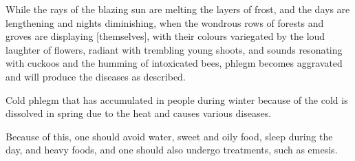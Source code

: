 \begin{translation}
\item[39--41] %
While the rays of the blazing sun %
are melting %
the layers of frost, %
and the days are lengthening and nights diminishing, %
%
when the wondrous  %
rows of forests and groves %
are displaying [themselves], %
with their colours variegated %
by the loud laughter of flowers, %
radiant with trembling young shoots, %
and sounds %
resonating with cuckoos %
and the humming of intoxicated bees, %
%
phlegm becomes aggravated %
and will produce %
the diseases as described. %

\item[42] 
Cold phlegm that has accumulated in people during winter because of the cold is dissolved %
in spring due to the heat and causes various diseases.

\item[43] 
Because of this, one should avoid water, sweet and oily food, sleep during the day, and heavy foods, and one should also undergo treatments, such as emesis.

\end{translation}